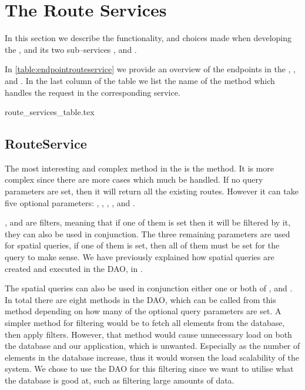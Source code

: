 \section{The Route Services}
In this section we describe the functionality, and choices made when developing the , 
and its two sub--services , and .

In \cref{table:endpointrouteservice} we provide an overview of the endpoints in the , , and . 
In the last column of the table we list the name of the method which handles the request in the corresponding service. 

{route_services_table.tex}

\subsection{RouteService}
The most interesting and complex method in the  is the  method.
It is more complex since there are more cases which much be handled. 
If no query parameters are set, then it will return all the existing routes.
However it can take five optional parameters: , , , , and .

, and  are filters, meaning that if one of them is set then it will be filtered by it, 
they can also be used in conjunction.
The three remaining parameters are used for spatial queries, if one of them is set, then all of them must be set for the query to make sense.
We have previously explained how spatial queries are created and executed in the \ac{DAO}, in .

The spatial queries can also be used in conjunction either one or both of , and . 
In total there are eight methods in the \ac{DAO}, which can be called from this method depending on how many of the optional query parameters are set.
A simpler method for filtering would be to fetch all elements from the database, then apply filters. 
However, that method would cause unnecessary load on both the database and our application, which is unwanted. 
Especially as the number of elements in the database increase, thus it would worsen the load scalability of the system. 
We chose to use the \ac{DAO} for this filtering since we want to utilise what the database is good at, such as filtering large amounts of data.

